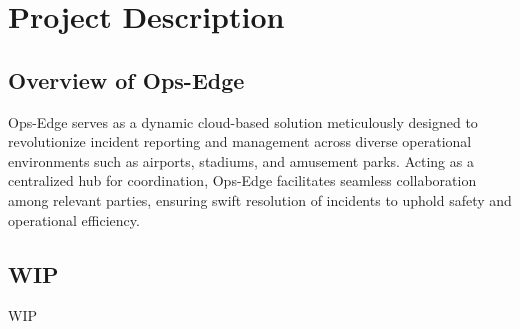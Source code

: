 \chapter{Project Description}
\label{ch:project_description}

\section{Overview of Ops-Edge}
\label{sec:project_description:overview}
Ops-Edge serves as a dynamic cloud-based solution meticulously designed to revolutionize incident reporting and management across diverse operational environments such as airports, stadiums, and amusement parks. Acting as a centralized hub for coordination, Ops-Edge facilitates seamless collaboration among relevant parties, ensuring swift resolution of incidents to uphold safety and operational efficiency.

%
%
\section{WIP}
\label{sec:project_description:wip}
WIP
